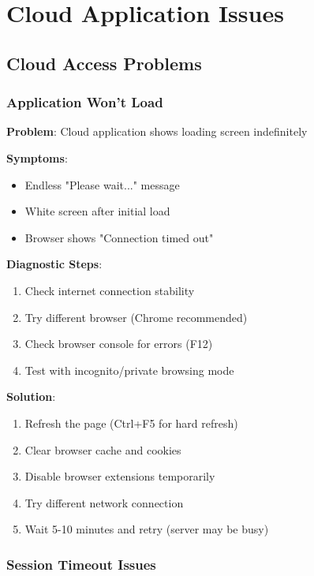 \section{Cloud Application Issues}

\subsection{Cloud Access Problems}

\subsubsection{Application Won't Load}

\textbf{Problem}: Cloud application shows loading screen indefinitely

\textbf{Symptoms}:
\begin{itemize}
	\item Endless "Please wait..." message
	\item White screen after initial load
	\item Browser shows "Connection timed out"
\end{itemize}

\textbf{Diagnostic Steps}:
\begin{enumerate}
	\item Check internet connection stability
	\item Try different browser (Chrome recommended)
	\item Check browser console for errors (F12)
	\item Test with incognito/private browsing mode
\end{enumerate}

\textbf{Solution}:
\begin{enumerate}
	\item Refresh the page (Ctrl+F5 for hard refresh)
	\item Clear browser cache and cookies
	\item Disable browser extensions temporarily
	\item Try different network connection
	\item Wait 5-10 minutes and retry (server may be busy)
\end{enumerate}



\subsubsection{Session Timeout Issues}

